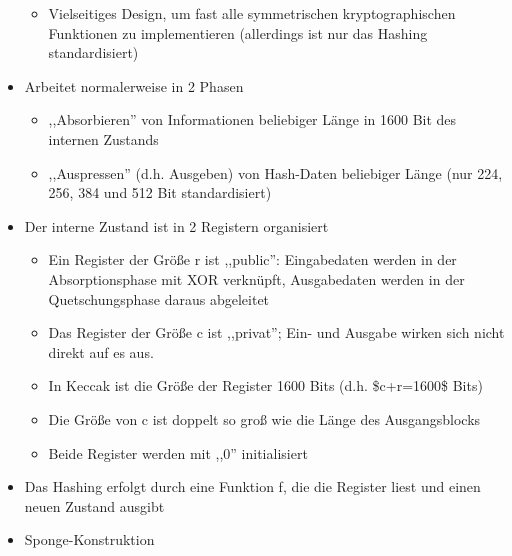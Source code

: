 \documentclass[a4paper]{article}
\begin{document}
\begin{multicols}{3}
\begin{itemize}
              \begin{itemize}
                  \item
                        Vielseitiges Design, um fast alle symmetrischen kryptographischen
                        Funktionen zu implementieren (allerdings ist nur das Hashing
                        standardisiert)
              \end{itemize}
        \item
              Arbeitet normalerweise in 2 Phasen

              \begin{itemize}
                  \item
                        ,,Absorbieren'' von Informationen beliebiger Länge in 1600 Bit des
                        internen Zustands
                  \item
                        ,,Auspressen'' (d.h. Ausgeben) von Hash-Daten beliebiger Länge (nur
                        224, 256, 384 und 512 Bit standardisiert)
              \end{itemize}
        \item
              Der interne Zustand ist in 2 Registern organisiert

              \begin{itemize}
                  \item
                        Ein Register der Größe r ist ,,public'': Eingabedaten werden in der
                        Absorptionsphase mit XOR verknüpft, Ausgabedaten werden in der
                        Quetschungsphase daraus abgeleitet
                  \item
                        Das Register der Größe c ist ,,privat''; Ein- und Ausgabe wirken
                        sich nicht direkt auf es aus.
                  \item
                        In Keccak ist die Größe der Register 1600 Bits (d.h. \$c+r=1600\$
                        Bits)
                  \item
                        Die Größe von c ist doppelt so groß wie die Länge des Ausgangsblocks
                  \item
                        Beide Register werden mit ,,0'' initialisiert
              \end{itemize}
        \item
              Das Hashing erfolgt durch eine Funktion f, die die Register liest und
              einen neuen Zustand ausgibt
        \item
              Sponge-Konstruktion


\end{itemize}
\end{multicols}
\end{document}
